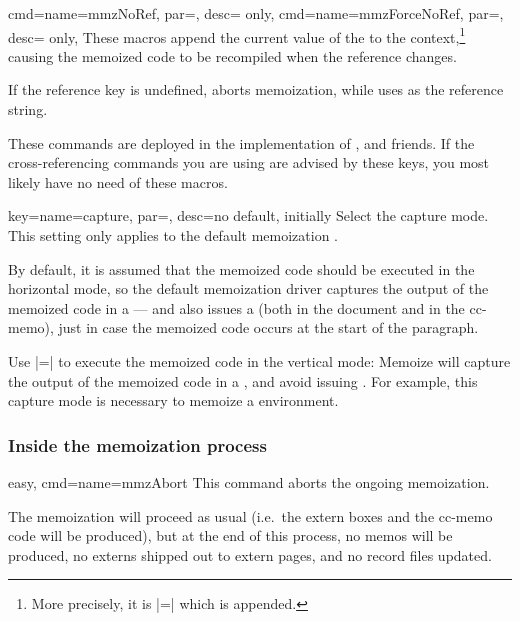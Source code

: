 \documentclass[a4paper,11pt]{article}
\begin{document}
\begin{doc}{
    cmd={name=mmzNoRef, par=, desc= only},
    cmd={name=mmzForceNoRef, par=, desc= only},
  }
  These macros append the current value of the  to the
  context,\footnote{More precisely, it is |=| which is appended.}  causing the memoized code to be recompiled
  when the reference changes.

  If the reference key is undefined,  aborts memoization,
  while  uses  as the reference string.

  These commands are deployed in the implementation of ,  and friends.  If the
  cross-referencing commands you are using are advised by these keys, you most
  likely have no need of these macros.
\end{doc}

\begin{doc}{
    key={name=capture, par=,
      desc={no default, initially }}
  }
  Select the capture mode.  This setting only applies to the default
  memoization .

  By default, it is assumed that the memoized code should be executed in the
  horizontal mode, so the default memoization driver captures the output of the
  memoized code in a  --- and also issues a 
  (both in the document and in the cc-memo), just in case the memoized code
  occurs at the start of the paragraph.

  Use |=| to execute the memoized code in
  the vertical mode: Memoize will capture the output of the memoized code in a
  , and avoid issuing .  For example, this
  capture mode is necessary to memoize a  environment.
\end{doc}


\subsubsection{Inside the memoization process}
\label{sec:ref:memoization:process}

\begin{doc}{easy, cmd={name=mmzAbort}}
  This command aborts the ongoing memoization.

  The memoization will proceed as usual (i.e.\ the extern boxes and the cc-memo
  code will be produced), but at the end of this process, no memos will be
  produced, no externs shipped out to extern pages, and no record files
  updated.
\end{doc}
\end{document}
